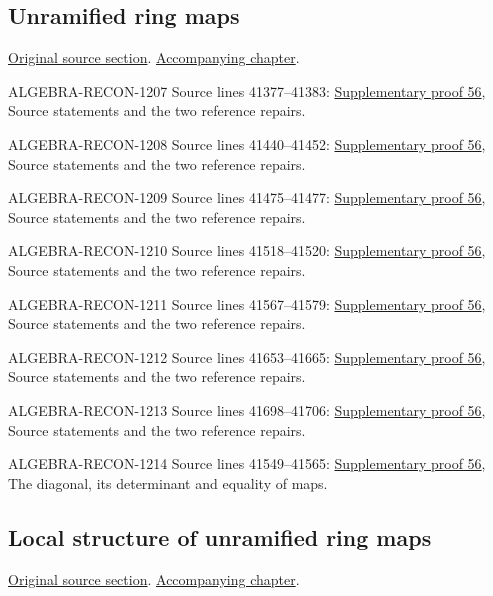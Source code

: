 \subsection{Unramified ring maps}
\hypertarget{algebra-source-section-unramified}{}
\noindent\href{https://github.com/stacks/stacks-project/blob/a04446e57ec1fbc252a871afcec7752fb2807b14/algebra.tex\#L41377}{Original source section}. \href{algebra.pdf\#nameddest=section-unramified}{Accompanying chapter}.

\begin{AlgebraSourceRoutes}
\item[ALGEBRA-RECON-1207] Source lines 41377--41383: \hyperlink{algebra_unramified_notes_20260928}{Supplementary proof 56}, Source statements and the two reference repairs.
\item[ALGEBRA-RECON-1208] Source lines 41440--41452: \hyperlink{algebra_unramified_notes_20260928}{Supplementary proof 56}, Source statements and the two reference repairs.
\item[ALGEBRA-RECON-1209] Source lines 41475--41477: \hyperlink{algebra_unramified_notes_20260928}{Supplementary proof 56}, Source statements and the two reference repairs.
\item[ALGEBRA-RECON-1210] Source lines 41518--41520: \hyperlink{algebra_unramified_notes_20260928}{Supplementary proof 56}, Source statements and the two reference repairs.
\item[ALGEBRA-RECON-1211] Source lines 41567--41579: \hyperlink{algebra_unramified_notes_20260928}{Supplementary proof 56}, Source statements and the two reference repairs.
\item[ALGEBRA-RECON-1212] Source lines 41653--41665: \hyperlink{algebra_unramified_notes_20260928}{Supplementary proof 56}, Source statements and the two reference repairs.
\item[ALGEBRA-RECON-1213] Source lines 41698--41706: \hyperlink{algebra_unramified_notes_20260928}{Supplementary proof 56}, Source statements and the two reference repairs.
\item[ALGEBRA-RECON-1214] Source lines 41549--41565: \hyperlink{algebra_unramified_notes_20260928}{Supplementary proof 56}, The diagonal, its determinant and equality of maps.
\end{AlgebraSourceRoutes}

\subsection{Local structure of unramified ring maps}
\hypertarget{algebra-source-section-local-structure-unramified}{}
\noindent\href{https://github.com/stacks/stacks-project/blob/a04446e57ec1fbc252a871afcec7752fb2807b14/algebra.tex\#L41712}{Original source section}. \href{algebra.pdf\#nameddest=section-local-structure-unramified}{Accompanying chapter}.

